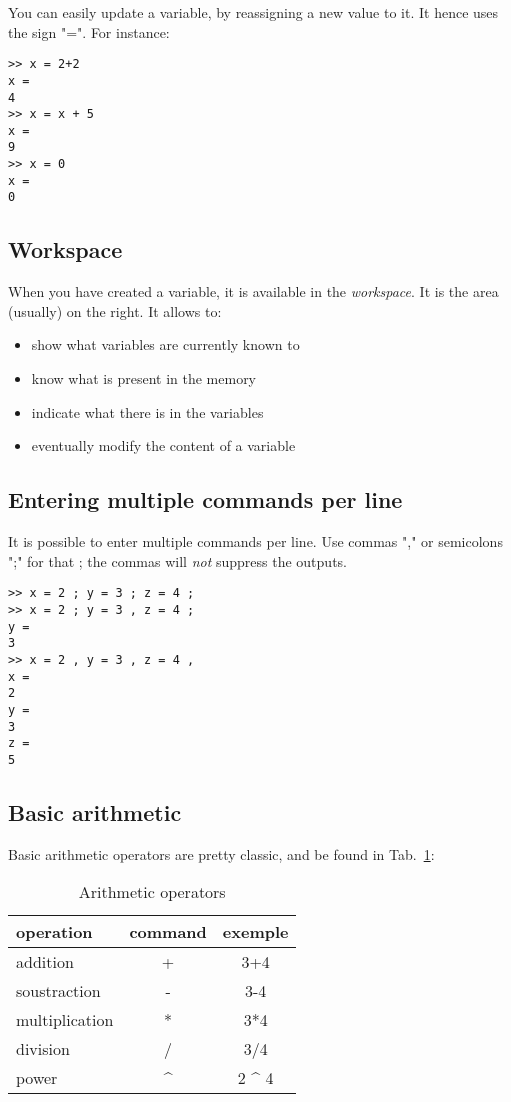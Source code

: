 			You can easily update a variable, by reassigning a new value to it. It hence uses the sign "=".
			For instance:
\begin{lstlisting}
>> x = 2+2
x = 
4
>> x = x + 5
x =
9
>> x = 0
x =
0
\end{lstlisting}

	\subsection{Workspace}
		When you have created a variable, it is available in the \emph{workspace}.
		It is the area (usually) on the right.
		It allows to:
		\begin{itemize}
			\item show what variables are currently known to \matlab
			\item know what is present in the memory
			\item indicate what there is in the variables
			\item eventually modify the content of a variable
		\end{itemize}

	\subsection{Entering multiple commands per line}
		It is possible to enter multiple commands per line. 
		Use commas "," or semicolons ";" for that ; the commas will \emph{not} suppress the outputs.

\begin{lstlisting}
>> x = 2 ; y = 3 ; z = 4 ;
>> x = 2 ; y = 3 , z = 4 ;
y = 
3
>> x = 2 , y = 3 , z = 4 ,
x = 
2
y = 
3
z = 
5
\end{lstlisting}

	\subsection{Basic arithmetic}
		Basic arithmetic operators are pretty classic, and be found in Tab.~\ref{tab-basic_arithmetic}:
		\begin{table}[h!]\caption{Arithmetic operators}
			\label{tab-basic_arithmetic}
			\center
			\begin{tabular}{|l|c|c|}
				\hline
				operation & command & exemple \\
				\hline
				addition & + & 3+4 \\
				soustraction & - & 3-4 \\
				multiplication & * & 3*4 \\
				division & / & 3/4 \\
				power & \^{} & 2 \^{} 4 \\
				\hline
			\end{tabular}
		\end{table}

